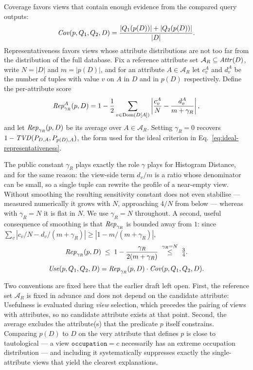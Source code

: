 Coverage favors views that contain enough evidence from the compared query outputs:
\begin{equation}
\mathit{Cov}(p,Q_1,Q_2,D)=\frac{|Q_1(p(D))|+|Q_2(p(D))|}{|D|}.
\label{eq:coverage-proxy}
\end{equation}
Representativeness favors views whose attribute distributions are not too far from the distribution of the full database.
Fix a reference attribute set $\mathcal{A}_R\subseteq\mathit{Attr}(D)$, write $N=|D|$ and $m=|p(D)|$, and for an attribute $A\in\mathcal{A}_R$ let $c^A_v$ and $d^A_v$ be the number of tuples with value $v$ on $A$ in $D$ and in $p(D)$ respectively.
Define the per-attribute score
\begin{equation}
\mathit{Rep}^A_{\gamma_R}(p,D)=1-\frac{1}{2}\sum_{v\in\operatorname{Dom}(D[A])}\left|\frac{c^A_v}{N}-\frac{d^A_v}{m+\gamma_R}\right| ,
\label{eq:representativeness-proxy}
\end{equation}
and let $\mathit{Rep}_{\gamma_R}(p,D)$ be its average over $A\in\mathcal{A}_R$.
Setting $\gamma_R=0$ recovers $1-\mathit{TVD}(P_{D,A},P_{p(D),A})$, the form used for the ideal criterion in Eq.~\eqref{eq:ideal-representativeness}.

The public constant $\gamma_R$ plays exactly the role $\gamma$ plays for Histogram Distance, and for the same reason: the view-side term $d_v/m$ is a ratio whose denominator can be small, so a single tuple can rewrite the profile of a near-empty view.
Without smoothing the resulting sensitivity constant does not even stabilise --- measured numerically it grows with $N$, approaching $4/N$ from below --- whereas with $\gamma_R=N$ it is flat in $N$.
We use $\gamma_R=N$ throughout.
A second, useful consequence of smoothing is that $\mathit{Rep}_{\gamma_R}$ is bounded away from $1$: since $\sum_v|c_v/N-d_v/(m+\gamma_R)|\ge|1-m/(m+\gamma_R)|$,
\begin{equation}
\mathit{Rep}_{\gamma_R}(p,D)\;\le\;1-\frac{\gamma_R}{2(m+\gamma_R)}\;\overset{\gamma_R=N}{\le}\;\tfrac{3}{4}.
\label{eq:rep-upper}
\end{equation}
\begin{equation}
\mathit{Use}(p,Q_1,Q_2,D)= \mathit{Rep}_{\gamma_R}(p,D)\cdot \mathit{Cov}(p,Q_1,Q_2,D).
\label{eq:usefulness-proxy}
\end{equation}

Two conventions are fixed here that the earlier draft left open.
First, the reference set $\mathcal{A}_R$ is fixed in advance and does not depend on the candidate attribute: Usefulness is evaluated during \emph{view} selection, which precedes the pairing of views with attributes, so no candidate attribute exists at that point.
Second, the average excludes the attribute(s) that the predicate $p$ itself constrains. Comparing $p(D)$ to $D$ on the very attribute that defines $p$ is close to tautological --- a view $\texttt{occupation}=c$ necessarily has an extreme occupation distribution --- and including it systematically suppresses exactly the single-attribute views that yield the clearest explanations.

